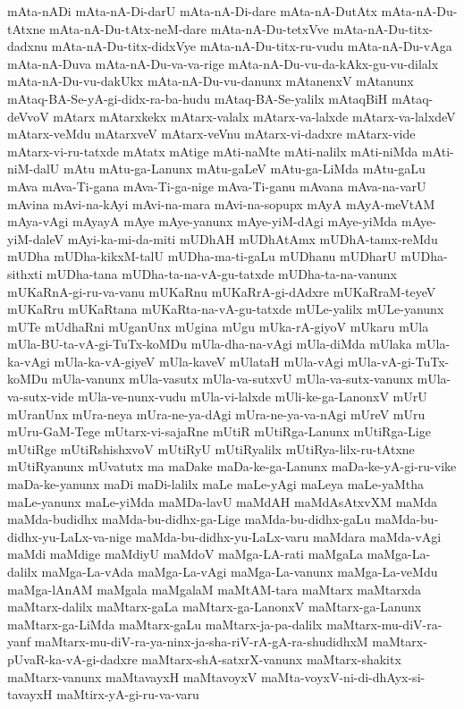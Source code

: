{mAta-nADi
mAta-nA-Di-darU
mAta-nA-Di-dare
mAta-nA-DutAtx
mAta-nA-Du-tAtxne
mAta-nA-Du-tAtx-neM-dare
mAta-nA-Du-tetxVve
mAta-nA-Du-titx-dadxnu
mAta-nA-Du-titx-didxVye
mAta-nA-Du-titx-ru-vudu
mAta-nA-Du-vAga
mAta-nA-Duva
mAta-nA-Du-va-va-rige
mAta-nA-Du-vu-da-kAkx-gu-vu-dilalx
mAta-nA-Du-vu-dakUkx
mAta-nA-Du-vu-danunx
mAtanenxV
mAtanunx
mAtaq-BA-Se-yA-gi-didx-ra-ba-hudu
mAtaq-BA-Se-yalilx
mAtaqBiH
mAtaq-deVvoV
mAtarx
mAtarxkekx
mAtarx-valalx
mAtarx-va-lalxde
mAtarx-va-lalxdeV
mAtarx-veMdu
mAtarxveV
mAtarx-veVnu
mAtarx-vi-dadxre
mAtarx-vide
mAtarx-vi-ru-tatxde
mAtatx
mAtige
mAti-naMte
mAti-nalilx
mAti-niMda
mAti-niM-dalU
mAtu
mAtu-ga-Lanunx
mAtu-gaLeV
mAtu-ga-LiMda
mAtu-gaLu
mAva
mAva-Ti-gana
mAva-Ti-ga-nige
mAva-Ti-ganu
mAvana
mAva-na-varU
mAvina
mAvi-na-kAyi
mAvi-na-mara
mAvi-na-sopupx
mAyA
mAyA-meVtAM
mAya-vAgi
mAyayA
mAye
mAye-yanunx
mAye-yiM-dAgi
mAye-yiMda
mAye-yiM-daleV
mAyi-ka-mi-da-miti
mUDhAH
mUDhAtAmx
mUDhA-tamx-reMdu
mUDha
mUDha-kikxM-talU
mUDha-ma-ti-gaLu
mUDhanu
mUDharU
mUDha-sithxti
mUDha-tana
mUDha-ta-na-vA-gu-tatxde
mUDha-ta-na-vanunx
mUKaRnA-gi-ru-va-vanu
mUKaRnu
mUKaRrA-gi-dAdxre
mUKaRraM-teyeV
mUKaRru
mUKaRtana
mUKaRta-na-vA-gu-tatxde
mULe-yalilx
mULe-yanunx
mUTe
mUdhaRni
mUganUnx
mUgina
mUgu
mUka-rA-giyoV
mUkaru
mUla
mUla-BU-ta-vA-gi-TuTx-koMDu
mUla-dha-na-vAgi
mUla-diMda
mUlaka
mUla-ka-vAgi
mUla-ka-vA-giyeV
mUla-kaveV
mUlataH
mUla-vAgi
mUla-vA-gi-TuTx-koMDu
mUla-vanunx
mUla-vasutx
mUla-va-sutxvU
mUla-va-sutx-vanunx
mUla-va-sutx-vide
mUla-ve-nunx-vudu
mUla-vi-lalxde
mUli-ke-ga-LanonxV
mUrU
mUranUnx
mUra-neya
mUra-ne-ya-dAgi
mUra-ne-ya-va-nAgi
mUreV
mUru
mUru-GaM-Tege
mUtarx-vi-sajaRne
mUtiR
mUtiRga-Lanunx
mUtiRga-Lige
mUtiRge
mUtiRshishxvoV
mUtiRyU
mUtiRyalilx
mUtiRya-lilx-ru-tAtxne
mUtiRyanunx
mUvatutx
ma
maDake
maDa-ke-ga-Lanunx
maDa-ke-yA-gi-ru-vike
maDa-ke-yanunx
maDi
maDi-lalilx
maLe
maLe-yAgi
maLeya
maLe-yaMtha
maLe-yanunx
maLe-yiMda
maMDa-lavU
maMdAH
maMdAsAtxvXM
maMda
maMda-budidhx
maMda-bu-didhx-ga-Lige
maMda-bu-didhx-gaLu
maMda-bu-didhx-yu-LaLx-va-nige
maMda-bu-didhx-yu-LaLx-varu
maMdara
maMda-vAgi
maMdi
maMdige
maMdiyU
maMdoV
maMga-LA-rati
maMgaLa
maMga-La-dalilx
maMga-La-vAda
maMga-La-vAgi
maMga-La-vanunx
maMga-La-veMdu
maMga-lAnAM
maMgala
maMgalaM
maMtAM-tara
maMtarx
maMtarxda
maMtarx-dalilx
maMtarx-gaLa
maMtarx-ga-LanonxV
maMtarx-ga-Lanunx
maMtarx-ga-LiMda
maMtarx-gaLu
maMtarx-ja-pa-dalilx
maMtarx-mu-diV-ra-yanf
maMtarx-mu-diV-ra-ya-ninx-ja-sha-riV-rA-gA-ra-shudidhxM
maMtarx-pUvaR-ka-vA-gi-dadxre
maMtarx-shA-satxrX-vanunx
maMtarx-shakitx
maMtarx-vanunx
maMtavayxH
maMtavoyxV
maMta-voyxV-ni-di-dhAyx-si-tavayxH
maMtirx-yA-gi-ru-va-varu
}
